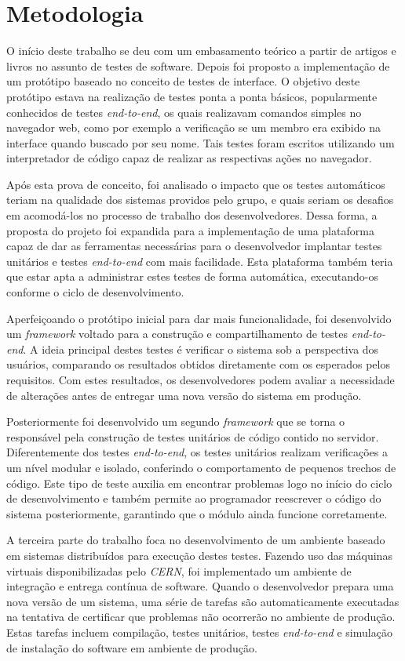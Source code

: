 \section{Metodologia}
 O início deste trabalho se deu com um embasamento teórico a partir de artigos e livros no assunto de testes de software. Depois foi proposto a implementação de um protótipo baseado no conceito de testes de interface. O objetivo deste protótipo estava na realização de testes ponta a ponta básicos, popularmente conhecidos de testes \emph{end-to-end}, os quais realizavam comandos simples no navegador web, como por exemplo a verificação se um membro era exibido na interface quando buscado por seu nome. Tais testes foram escritos utilizando um interpretador de código capaz de realizar as respectivas ações no navegador.

 Após esta prova de conceito, foi analisado o impacto que os testes automáticos teriam na qualidade dos sistemas providos pelo grupo, e quais seriam os desafios em acomodá-los no processo de trabalho dos desenvolvedores. Dessa forma, a proposta do projeto foi expandida para a implementação de uma plataforma capaz de dar as ferramentas necessárias para o desenvolvedor implantar testes unitários e testes \emph{end-to-end} com mais facilidade. Esta plataforma também teria que estar apta a administrar estes testes de forma automática, executando-os conforme o ciclo de desenvolvimento.

Aperfeiçoando o protótipo inicial para dar mais funcionalidade, foi desenvolvido um \emph{framework} voltado para a construção e compartilhamento de testes \emph{end-to-end}. A ideia principal destes testes é verificar o sistema sob a perspectiva dos usuários, comparando os resultados obtidos diretamente com os esperados pelos requisitos. Com estes resultados, os desenvolvedores podem avaliar a necessidade de alterações antes de entregar uma nova versão do sistema em produção.

Posteriormente foi desenvolvido um segundo \emph{framework} que se torna o responsável pela construção de testes unitários de código contido no servidor. Diferentemente dos testes \emph{end-to-end}, os testes unitários realizam verificações a um nível modular e isolado, conferindo o comportamento de pequenos trechos de código. Este tipo de teste auxilia em encontrar problemas logo no início do ciclo de desenvolvimento e também permite ao programador reescrever o código do sistema posteriormente, garantindo que o módulo ainda funcione corretamente.

A terceira parte do trabalho foca no desenvolvimento de um ambiente baseado em sistemas distribuídos para execução destes testes. Fazendo uso das máquinas virtuais disponibilizadas pelo \emph{CERN}, foi implementado um ambiente de integração e entrega contínua de software. Quando o desenvolvedor prepara uma nova versão de um sistema, uma série de tarefas são automaticamente executadas na tentativa de certificar que problemas não ocorrerão no ambiente de produção. Estas tarefas incluem compilação, testes unitários, testes \emph{end-to-end} e simulação de instalação do software em ambiente de produção.

